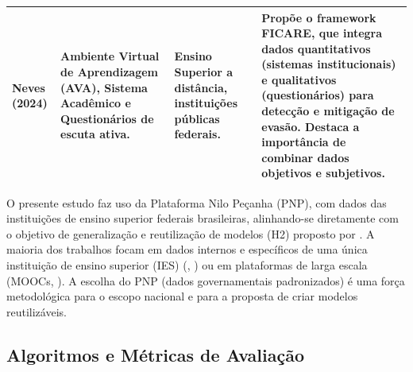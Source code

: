 \documentclass[english, spanish, brazilian]{RBIEarticle} %
\begin{document}
\begin{longtable}{|p{3cm}|p{3.5cm}|p{4.5cm}|p{5cm}|}
    Neves (2024) & Ambiente Virtual de Aprendizagem (AVA), Sistema Acadêmico e Questionários de escuta ativa. & Ensino Superior a distância, instituições públicas federais. & Propõe o framework FICARE, que integra dados quantitativos (sistemas institucionais) e qualitativos (questionários) para detecção e mitigação de evasão. Destaca a importância de combinar dados objetivos e subjetivos. \\ 
    \bottomrule
\end{longtable}

O presente estudo faz uso da Plataforma Nilo Peçanha (PNP), com dados das instituições de ensino superior federais brasileiras, alinhando-se diretamente com o objetivo de generalização e reutilização de modelos (H2) proposto por \cite{jesus2024mapeamento}. A maioria dos trabalhos focam em dados internos e específicos de uma única instituição de ensino superior (IES) (\cite{ramos2018comparativo}, \cite{neves2024ficare}) ou em plataformas de larga escala (MOOCs, \cite{tamada2025predicting}). A escolha do PNP (dados governamentais padronizados) é uma força metodológica para o escopo nacional e para a proposta de criar modelos reutilizáveis.

\newpage
\subsection{Algoritmos e Métricas de Avaliação}
\end{document}
